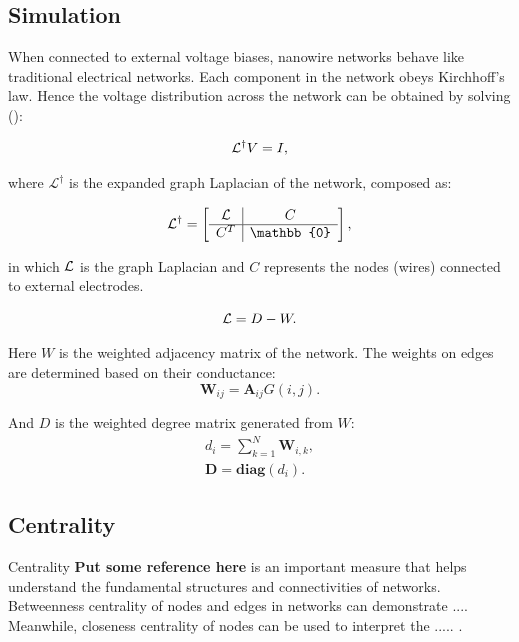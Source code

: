 \documentclass[%
 reprint,
 amsmath,amssymb,
 aps,
floatfix,
]{revtex4-2}
\begin{document}
\subsection{\label{sec:level2} Simulation}
When connected to external voltage biases, nanowire networks behave like traditional electrical networks. Each component in the network obeys Kirchhoff's law. Hence the voltage distribution across the network can be obtained by solving (\cite{Dorfler2018}):

\begin{equation}
{\cal L}^\dagger V = I,
\end{equation}

where $\mathcal{L}^\dagger$ is the expanded graph Laplacian of the network, composed as:

\begin{equation}
	\cal L^\dagger = 
	\left[
	\begin{array}{c|c}
	\cal L&  C\\ 
	\hline
	C^T & \mathbb{0}  
	\end{array}
	\right],
\end{equation}

in which $\cal L$ is the graph Laplacian and $C$ represents the nodes (wires) connected to external electrodes. 

\begin{equation}
{\cal L} = D - W.
\end{equation}

Here $W$ is the weighted adjacency matrix of the network. The weights on edges are determined based on their conductance:
\begin{equation}
	\mathbf W_{ij} = \mathbf A_{ij} G(i,j).
\end{equation}

And $D$ is the weighted degree matrix generated from $W$:
\begin{align}
	d_i = \sum \limits_{k=1}^{N} \mathbf W_{i,k},\\
	\mathbf D = \textbf{diag}(d_i).
\end{align}


\subsection{\label{sec:level2} Centrality}
Centrality \textbf{Put some reference here} is an important measure that helps understand the fundamental structures and connectivities of networks. Betweenness centrality of nodes and edges in networks can demonstrate .... Meanwhile, closeness centrality of nodes can be used to interpret the ..... \cite{Newman2010}.
\end{document}
